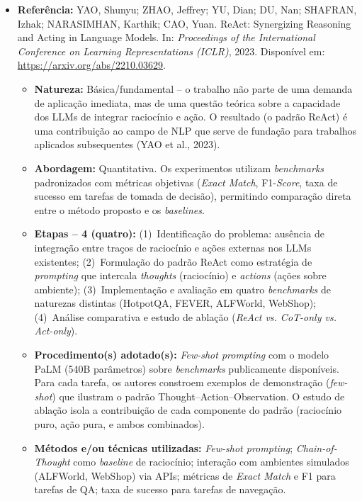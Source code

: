 \documentclass[12pt, a4paper]{article}
\begin{document}
\begin{itemize}

  \item \textbf{Referência:}
  YAO, Shunyu; ZHAO, Jeffrey; YU, Dian; DU, Nan; SHAFRAN, Izhak; NARASIMHAN, Karthik; CAO, Yuan.
  ReAct: Synergizing Reasoning and Acting in Language Models.
  In: \textit{Proceedings of the International Conference on Learning Representations (ICLR)}, 2023.
  Disponível em: \url{https://arxiv.org/abs/2210.03629}.

  \begin{itemize}

    \item[(a)] \textbf{Natureza:} Básica/fundamental -- o trabalho não parte de uma demanda de aplicação imediata, mas de uma questão teórica sobre a capacidade dos LLMs de integrar raciocínio e ação. O resultado (o padrão ReAct) é uma contribuição ao campo de NLP que serve de fundação para trabalhos aplicados subsequentes (YAO et al., 2023).

    \item[(b)] \textbf{Abordagem:} Quantitativa. Os experimentos utilizam \textit{benchmarks} padronizados com métricas objetivas (\textit{Exact Match}, F1-\textit{Score}, taxa de sucesso em tarefas de tomada de decisão), permitindo comparação direta entre o método proposto e os \textit{baselines}.

    \item[(c)] \textbf{Etapas -- 4 (quatro):}
    (1)~Identificação do problema: ausência de integração entre traços de raciocínio e ações externas nos LLMs existentes;
    (2)~Formulação do padrão ReAct como estratégia de \textit{prompting} que intercala \textit{thoughts} (raciocínio) e \textit{actions} (ações sobre ambiente);
    (3)~Implementação e avaliação em quatro \textit{benchmarks} de naturezas distintas (HotpotQA, FEVER, ALFWorld, WebShop);
    (4)~Análise comparativa e estudo de ablação (\textit{ReAct vs. CoT-only vs. Act-only}).

    \item[(d)] \textbf{Procedimento(s) adotado(s):}
    \textit{Few-shot prompting} com o modelo PaLM (540B parâmetros) sobre \textit{benchmarks} publicamente disponíveis.
    Para cada tarefa, os autores constroem exemplos de demonstração (\textit{few-shot}) que ilustram o padrão Thought--Action--Observation.
    O estudo de ablação isola a contribuição de cada componente do padrão (raciocínio puro, ação pura, e ambos combinados).

    \item[(e)] \textbf{Métodos e/ou técnicas utilizadas:}
    \textit{Few-shot prompting}; \textit{Chain-of-Thought} como \textit{baseline} de raciocínio; interação com ambientes simulados (ALFWorld, WebShop) via APIs; métricas de \textit{Exact Match} e F1 para tarefas de QA; taxa de sucesso para tarefas de navegação.


\end{itemize}
\end{itemize}
\end{document}
